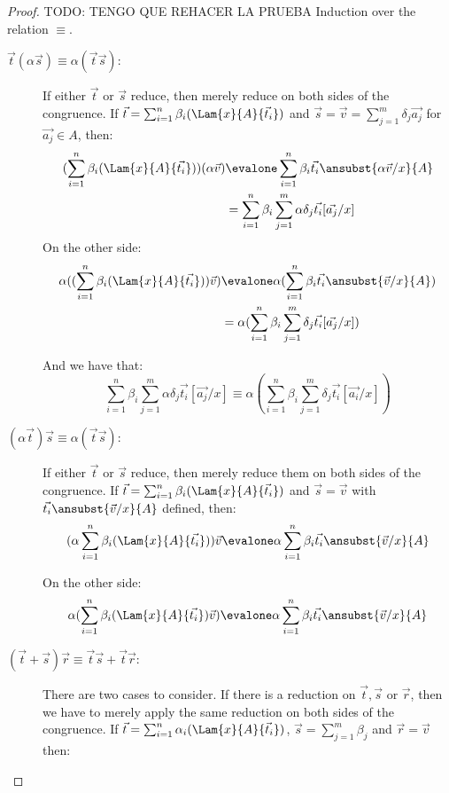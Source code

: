\begin{proof}
  {\color{red}TODO: TENGO QUE REHACER LA PRUEBA}
  \iffalse
  Induction over the relation $\equiv$.
  \begin{description}
    \item[$\vec{t} (\alpha\vec{s})\equiv\alpha(\vec{t}\vec{s})$:] If either $\vec{t}$ or $\vec{s}$ reduce, then merely reduce on both sides of the congruence. If $\vec{t} = \sum_{i=1}^{n}\beta_i (\Lam{x}{A}{\vec t_i})$ and $\vec{s}=\vec v= \sum_{j=1}^{m} \delta_j \vec{a_j}$ for $\vec{a_j}\in A$, then:
    \begin{align*}
      (\sum_{i=1}^{n}\beta_i (\Lam{x}{A}{\vec{t_i}})) (\alpha\vec{v})&\evalone\sum_{i=1}^{n}\beta_i \vec{t_i}\ansubst{\alpha\vec{v}/x}{A}\\
      &=\sum_{i=1}^{n}\beta_i \sum_{j=1}^{m}\alpha\delta_j \vec{t_i}[\vec{a_j}/x]
    \end{align*}
    On the other side:
    \begin{align*}  
    \alpha((\sum_{i=1}^{n}\beta_i (\Lam{x}{A}{\vec{t_i}}))\vec v)&\evalone
    \alpha(\sum_{i=1}^{n}\beta_i \vec{t_i}\ansubst{\vec{v}/x}{A})\\
    &=\alpha(\sum_{i=1}^{n}\beta_i\sum_{j=1}^{m}\delta_j\vec{t_i}[\vec{a_j}/x])
    \end{align*}

    And we have that: 
    \[\sum_{i=1}^{n}\beta_i \sum_{j=1}^{m}\alpha\delta_j \vec{t_i}[\vec{a_j}/x] \equiv \alpha(\sum_{i=1}^{n}\beta_i\sum_{j=1}^{m}\delta_j\vec{t_i}[\vec{a_i}/x])\]

    \item[$(\alpha\vec{t})\vec{s}\equiv\alpha(\vec{t}\vec{s})$:] If either $\vec{t}$ or $\vec{s}$ reduce, then merely reduce them on both sides of the congruence. If $\vec{t} = \sum_{i=1}^{n}\beta_i (\Lam{x}{A}{\vec t_i})$ and $\vec{s}=\vec v$ with $\vec{t_i}\ansubst{\vec{v}/x}{A}$ defined, then:
    \[
    (\alpha\sum_{i=1}^{n}\beta_i (\Lam{x}{A}{\vec{t_i}}))\vec v \evalone
    \alpha\sum_{i=1}^{n}\beta_i \vec{t_i}\ansubst{\vec v/x}{A}
    \]
    
    On the other side:
    \[  
      \alpha(\sum_{i=1}^{n}\beta_i (\Lam{x}{A}{\vec{t_i}})\vec v) \evalone
      \alpha\sum_{i=1}^{n}\beta_i \vec{t_i}\ansubst{\vec v/x}{A}
    \]

    \item[$(\vec{t}+\vec{s})\vec{r}\equiv \vec{t}\vec{s} + \vec{t}\vec{r}$:] There are two cases to consider. If there is a reduction on $\vec t,\vec s$ or $\vec r$, then we have to merely apply the same reduction on both sides of the congruence. If $\vec t=\sum_{i=1}^{n}\alpha_i (\Lam{x}{A}{\vec t_i})$, $\vec s=\sum_{j=1}^{m}\beta_j $ and $\vec r= \vec v$ then:
    

\end{description}
\end{proof}
